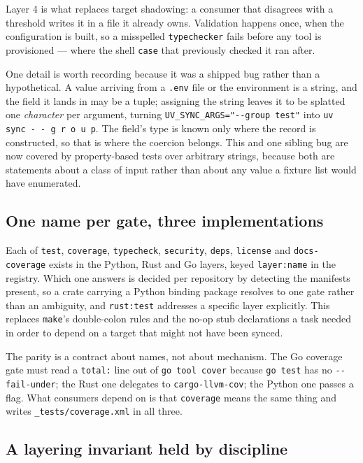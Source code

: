 \documentclass[11pt,a4paper]{article}
\begin{document}
Layer 4 is what replaces target shadowing: a consumer that disagrees with a threshold
writes it in a file it already owns. Validation happens once, when the configuration is
built, so a misspelled \texttt{typechecker} fails before any tool is provisioned --- where
the shell \texttt{case} that previously checked it ran after.

One detail is worth recording because it was a shipped bug rather than a hypothetical. A
value arriving from a \texttt{.env} file or the environment is a string, and the field it
lands in may be a tuple; assigning the string leaves it to be splatted one \emph{character}
per argument, turning \texttt{UV\_SYNC\_ARGS="-{}-group test"} into \texttt{uv sync - -\ g r
o u p}. The field's type is known only where the record is constructed, so that is where
the coercion belongs. This and one sibling bug are now covered by property-based tests over
arbitrary strings, because both are statements about a class of input rather than about any
value a fixture list would have enumerated.

\subsection{One name per gate, three implementations}

Each of \texttt{test}, \texttt{coverage}, \texttt{typecheck}, \texttt{security},
\texttt{deps}, \texttt{license} and \texttt{docs-coverage} exists in the Python, Rust and Go
layers, keyed \texttt{layer:name} in the registry. Which one answers is decided per
repository by detecting the manifests present, so a crate carrying a Python binding package
resolves to one gate rather than an ambiguity, and \texttt{rust:test} addresses a specific
layer explicitly. This replaces \texttt{make}'s double-colon rules and the no-op stub
declarations a task needed in order to depend on a target that might not have been synced.

The parity is a contract about names, not about mechanism. The Go coverage gate must read a
\texttt{total:} line out of \texttt{go tool cover} because \texttt{go test} has no
\texttt{-{}-fail-under}; the Rust one delegates to \texttt{cargo-llvm-cov}; the Python one
passes a flag. What consumers depend on is that \texttt{coverage} means the same thing and
writes \texttt{\_tests/coverage.xml} in all three.

\subsection{A layering invariant held by discipline}
\end{document}
